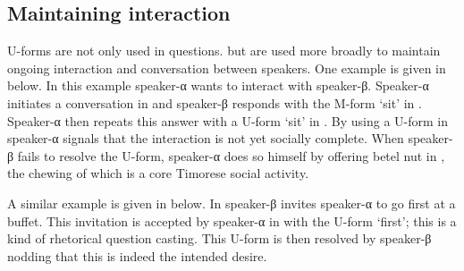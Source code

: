 \subsection{Maintaining interaction}\label{sec:MaiInt}
U-forms are not only used in questions.
but are used more broadly to maintain
ongoing interaction and conversation between speakers.
One example is given in  below.
In this example speaker-α wants to interact with speaker-β.
Speaker-α initiates a conversation in  and
speaker-β responds with the M-form  `sit' in .
Speaker-α then repeats this answer with a U-form  `sit' in .
By using a U-form in  speaker-α
signals that the interaction is not yet socially complete.
When speaker-β fails to resolve the U-form,
speaker-α does so himself by offering betel nut
in , the chewing of which is
a core Timorese social activity.

\begin{exe}
	\label{ex:19/09/14 p.97}
		\begin{xlist}
			\label{ex:19/09/14 p.97-1}
			\label{ex:19/09/14 p.97-2}
			\label{ex:19/09/14 p.97-3}
			\label{ex:19/09/14 p.97-4}
		\end{xlist}
\end{exe}

A similar example is given in  below.
In  speaker-β
invites speaker-α to go first at a buffet.
This invitation is accepted by speaker-α
in  with the U-form  `first';
this is a kind of rhetorical question casting.
This U-form is then resolved by speaker-β
nodding that this is indeed the intended desire.

